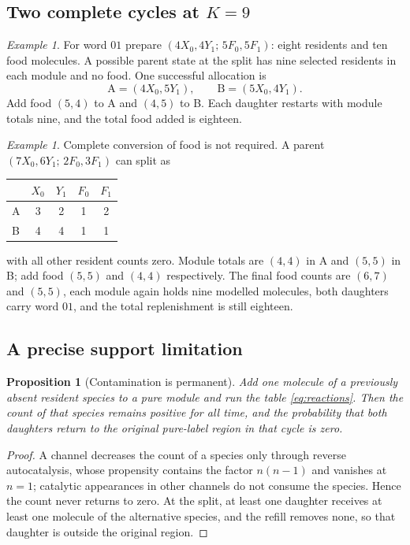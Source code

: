 \documentclass[11pt,a4paper]{article}
\theoremstyle{plain}
\newtheorem{proposition}[theorem]{Proposition}
\theoremstyle{definition}
\theoremstyle{remark}
\newtheorem{example}[theorem]{Example}
\begin{document}
\subsection{Two complete cycles at $K=9$}
\begin{example}
For word $01$ prepare $(4X_0,4Y_1;\,5F_0,5F_1)$: eight residents and ten food molecules. A possible parent state at the split has nine selected residents in each module and no food. One successful allocation is
\[
 \mathrm A=(4X_0,5Y_1),\qquad \mathrm B=(5X_0,4Y_1).
\]
Add food $(5,4)$ to A and $(4,5)$ to B. Each daughter restarts with module totals nine, and the total food added is eighteen.
\end{example}

\begin{example}
Complete conversion of food is not required. A parent $(7X_0,6Y_1;\,2F_0,3F_1)$ can split as
\begin{center}\small
\begin{tabular}{@{}lcccc@{}}
\toprule
 & $X_0$ & $Y_1$ & $F_0$ & $F_1$\\
\midrule
A & 3 & 2 & 1 & 2\\
B & 4 & 4 & 1 & 1\\
\bottomrule
\end{tabular}
\end{center}
with all other resident counts zero. Module totals are $(4,4)$ in A and $(5,5)$ in B; add food $(5,5)$ and $(4,4)$ respectively. The final food counts are $(6,7)$ and $(5,5)$, each module again holds nine modelled molecules, both daughters carry word $01$, and the total replenishment is still eighteen.
\end{example}

\subsection{A precise support limitation}
\begin{proposition}[Contamination is permanent]\label{prop:contamination}
Add one molecule of a previously absent resident species to a pure module and run the table \eqref{eq:reactions}. Then the count of that species remains positive for all time, and the probability that both daughters return to the original pure-label region in that cycle is zero.
\end{proposition}
\begin{proof}
A channel decreases the count of a species only through reverse autocatalysis, whose propensity contains the factor $n(n-1)$ and vanishes at $n=1$; catalytic appearances in other channels do not consume the species. Hence the count never returns to zero. At the split, at least one daughter receives at least one molecule of the alternative species, and the refill removes none, so that daughter is outside the original region.
\end{proof}
\end{document}
